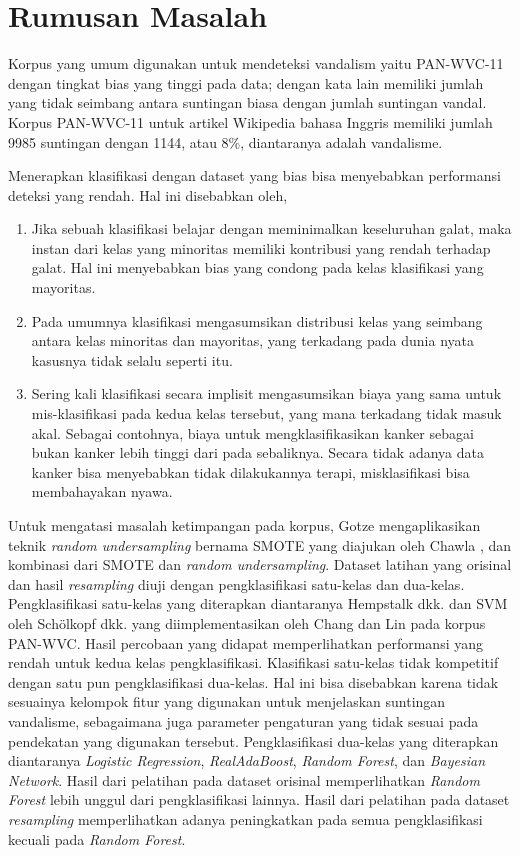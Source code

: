 \documentclass[12pt,a4paper,titlepage]{article}
\begin{document}
\section{Rumusan Masalah}\label{sec:rumusan-masalah}

Korpus yang umum digunakan untuk mendeteksi vandalism yaitu PAN-WVC-11 dengan tingkat bias yang tinggi pada data; dengan kata lain memiliki jumlah yang tidak seimbang antara suntingan biasa dengan jumlah suntingan vandal.
Korpus PAN-WVC-11 untuk artikel Wikipedia bahasa Inggris memiliki jumlah 9985 suntingan dengan 1144, atau 8\%, diantaranya adalah vandalisme.

Menerapkan klasifikasi dengan dataset yang bias bisa menyebabkan performansi deteksi yang rendah.
Hal ini disebabkan oleh,
\begin{enumerate}
	\item Jika sebuah klasifikasi belajar dengan meminimalkan keseluruhan galat, maka instan dari kelas yang minoritas memiliki kontribusi yang rendah terhadap galat.
Hal ini menyebabkan bias yang condong pada kelas klasifikasi yang mayoritas.
	\item Pada umumnya klasifikasi mengasumsikan distribusi kelas yang seimbang antara kelas minoritas dan mayoritas, yang terkadang pada dunia nyata kasusnya tidak selalu seperti itu.
	\item Sering kali klasifikasi secara implisit mengasumsikan biaya yang sama untuk mis-klasifikasi pada kedua kelas tersebut, yang mana terkadang tidak masuk akal.
Sebagai contohnya, biaya untuk mengklasifikasikan kanker sebagai bukan kanker lebih tinggi dari pada sebaliknya.
Secara tidak adanya data kanker bisa menyebabkan tidak dilakukannya terapi, misklasifikasi bisa membahayakan nyawa.
\end{enumerate}

Untuk mengatasi masalah ketimpangan pada korpus, Gotze \cite{gotze2014advanced} mengaplikasikan teknik \textit{random undersampling} bernama SMOTE yang diajukan oleh Chawla \cite{chawla2002smote}, dan kombinasi dari SMOTE dan \textit{random undersampling}.
Dataset latihan yang orisinal dan hasil \textit{resampling} diuji dengan pengklasifikasi satu-kelas dan dua-kelas.
Pengklasifikasi satu-kelas yang diterapkan diantaranya Hempstalk dkk. \cite{hempstalk2008one} dan SVM oleh Schölkopf dkk. \cite{scholkopf1999support} yang diimplementasikan oleh Chang dan Lin \cite{chang2011libsvm} pada korpus PAN-WVC.
Hasil percobaan yang didapat memperlihatkan performansi yang rendah untuk kedua kelas pengklasifikasi. Klasifikasi satu-kelas tidak kompetitif dengan satu pun pengklasifikasi dua-kelas.
Hal ini bisa disebabkan karena tidak sesuainya kelompok fitur yang digunakan untuk menjelaskan suntingan vandalisme, sebagaimana juga parameter pengaturan yang tidak sesuai pada pendekatan yang digunakan tersebut.
Pengklasifikasi dua-kelas yang diterapkan diantaranya \textit{Logistic Regression}, \textit{RealAdaBoost}, \textit{Random Forest}, dan \textit{Bayesian Network}.
Hasil dari pelatihan pada dataset orisinal memperlihatkan \textit{Random Forest} lebih unggul dari pengklasifikasi lainnya.
Hasil dari pelatihan pada dataset \textit{resampling} memperlihatkan adanya peningkatkan pada semua pengklasifikasi kecuali pada \textit{Random Forest}.
\end{document}
